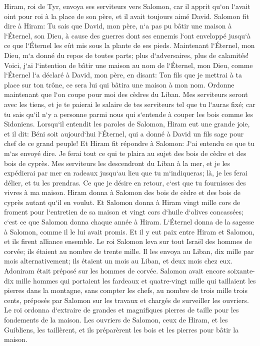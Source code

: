 \verse Hiram, roi de Tyr, envoya ses serviteurs vers Salomon, car il apprit qu`on l`avait oint pour roi à la place de son père, et il avait toujours aimé David. 
\verse Salomon fit dire à Hiram: 
\verse Tu sais que David, mon père, n`a pas pu bâtir une maison à l`Éternel, son Dieu, à cause des guerres dont ses ennemis l`ont enveloppé jusqu`à ce que l`Éternel les eût mis sous la plante de ses pieds. 
\verse Maintenant l`Éternel, mon Dieu, m`a donné du repos de toutes parts; plus d`adversaires, plus de calamités! 
\verse Voici, j`ai l`intention de bâtir une maison au nom de l`Éternel, mon Dieu, comme l`Éternel l`a déclaré à David, mon père, en disant: Ton fils que je mettrai à ta place sur ton trône, ce sera lui qui bâtira une maison à mon nom. 
\verse Ordonne maintenant que l`on coupe pour moi des cèdres du Liban. Mes serviteurs seront avec les tiens, et je te paierai le salaire de tes serviteurs tel que tu l`auras fixé; car tu sais qu`il n`y a personne parmi nous qui s`entende à couper les bois comme les Sidoniens. 
\verse Lorsqu`il entendit les paroles de Salomon, Hiram eut une grande joie, et il dit: Béni soit aujourd`hui l`Éternel, qui a donné à David un fils sage pour chef de ce grand peuple! 
\verse Et Hiram fit répondre à Salomon: J`ai entendu ce que tu m`as envoyé dire. Je ferai tout ce qui te plaira au sujet des bois de cèdre et des bois de cyprès. 
\verse Mes serviteurs les descendront du Liban à la mer, et je les expédierai par mer en radeaux jusqu`au lieu que tu m`indiqueras; là, je les ferai délier, et tu les prendras. Ce que je désire en retour, c`est que tu fournisses des vivres à ma maison. 
\verse Hiram donna à Salomon des bois de cèdre et des bois de cyprès autant qu`il en voulut. 
\verse Et Salomon donna à Hiram vingt mille cors de froment pour l`entretien de sa maison et vingt cors d`huile d`olives concassées; c`est ce que Salomon donna chaque année à Hiram. 
\verse L`Éternel donna de la sagesse à Salomon, comme il le lui avait promis. Et il y eut paix entre Hiram et Salomon, et ils firent alliance ensemble. 
\verse Le roi Salomon leva sur tout Israël des hommes de corvée; ils étaient au nombre de trente mille. 
\verse Il les envoya au Liban, dix mille par mois alternativement; ils étaient un mois au Liban, et deux mois chez eux. Adoniram était préposé sur les hommes de corvée. 
\verse Salomon avait encore soixante-dix mille hommes qui portaient les fardeaux et quatre-vingt mille qui taillaient les pierres dans la montagne, 
\verse sans compter les chefs, au nombre de trois mille trois cents, préposés par Salomon sur les travaux et chargés de surveiller les ouvriers. 
\verse Le roi ordonna d`extraire de grandes et magnifiques pierres de taille pour les fondements de la maison. 
\verse Les ouvriers de Salomon, ceux de Hiram, et les Guibliens, les taillèrent, et ils préparèrent les bois et les pierres pour bâtir la maison. 

